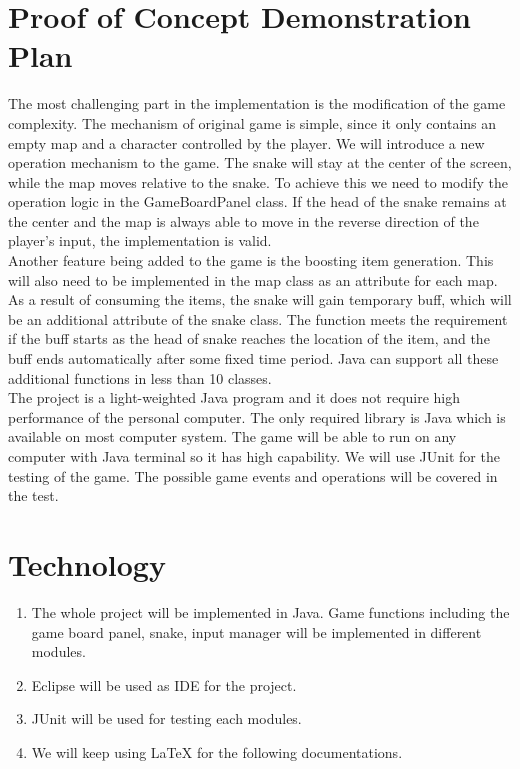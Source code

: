 \documentclass{article}
\begin{document}
\section{Proof of Concept Demonstration Plan}
    The most challenging part in the implementation is the modification of the game complexity. The mechanism of original game is simple, since it only contains an empty map and a character controlled by the player. We will introduce a new operation mechanism to the game. The snake will stay at the center of the screen, while the map moves relative to the snake. To achieve this we need to modify the operation logic in the GameBoardPanel class. If the head of the snake remains at the center and the map is always able to move in the reverse direction of the player's input, the implementation is valid.\\
    Another feature being added to the game is the boosting item generation. This will also need to be implemented in the map class as an attribute for each map. As a result of consuming the items, the snake will gain temporary buff, which will be an additional attribute of the snake class. The function meets the requirement if the buff starts as the head of snake reaches the location of the item, and the buff ends automatically after some fixed time period. Java can support all these additional functions in less than 10 classes. \\
    The project is a light-weighted Java program and it does not require high performance of the personal computer. The only required library is Java which is available on most computer system. The game will be able to run on any computer with Java terminal so it has high capability. We will use JUnit for the testing of the game. The possible game events and operations will be covered in the test.
\section{Technology}
    \begin{enumerate}
        \item The whole project will be implemented in Java. Game functions including the game board panel, snake, input manager will be implemented in different modules.
        \item Eclipse will be used as IDE for the project.
        \item JUnit will be used for testing each modules.
        \item We will keep using LaTeX for the following documentations.
    \end{enumerate}
\end{document}
